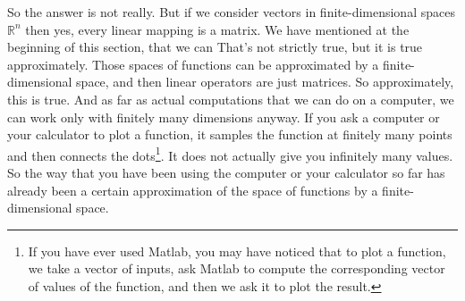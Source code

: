 So the answer is not really.  But if we consider vectors in
finite-dimensional spaces ${\mathbb R}^n$ then yes, every linear mapping is a
matrix.
We have mentioned at the beginning of this section, that we can
  That's not strictly true, but
it is true
approximately.  Those  spaces of functions can
be approximated by a finite-dimensional space, and then linear operators
are just matrices.  So approximately, this is true.  And as far as actual
computations that we can do on a computer, we can work only with
finitely many dimensions anyway.  If you ask a computer or your calculator
to plot a function,
it samples the function at finitely many points and then
connects the dots\footnote{If you have ever used Matlab, you may have
noticed that to plot a function, we take a vector of inputs, ask Matlab
to compute the corresponding vector of values of the function, and then we ask
it to plot the result.}.
It does not actually give you infinitely many values.
So the way that you have been using the computer or your calculator so far has
already been a certain approximation of the space of functions by a
finite-dimensional space.

\medskip

